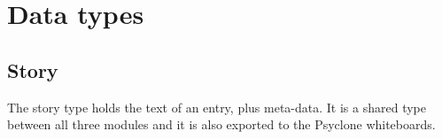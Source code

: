 \section{\label{sct:types}Data types}

\subsection{Story}

The story type holds the text of an entry, plus meta-data. It is a shared type
between all three modules and it is also exported to the Psyclone whiteboards.

